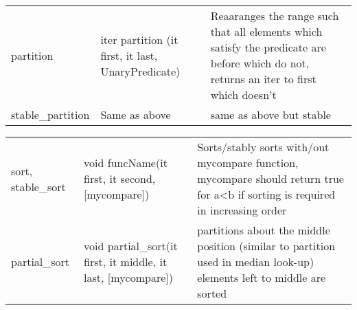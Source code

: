 
\begin{tabular}{p{2cm}|p{5cm}|p{5.5cm}}
    partition   &   iter partition (it first, it last, UnaryPredicate)  &   Reaaranges the range such that all elements which satisfy the predicate are before which do not, returns an iter to first which doesn't \\
    stable\_partition    &   Same as above   &   same as above but stable \\
\end{tabular}


\begin{tabular}{p{2cm}|p{5cm}|p{5.5cm}}
    sort, stable\_sort   &   void funcName(it first, it second, [mycompare])   &   Sorts/stably sorts with/out mycompare function, mycompare should return true for a\textless b if sorting is required in increasing order \\
    partial\_sort    &   void partial\_sort(it first, it middle, it last, [mycompare])    &   partitions about the middle position (similar to partition used in median look-up) elements left to middle are sorted \\

\end{tabular}
